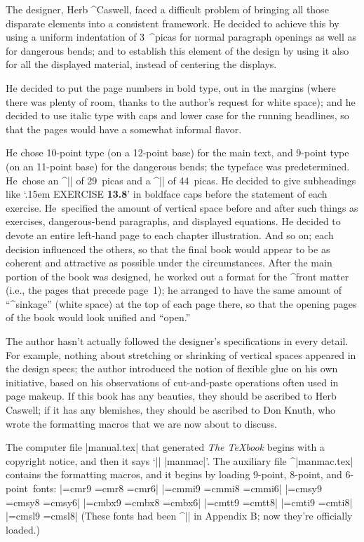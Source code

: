 The designer, Herb ^{Caswell}, faced a difficult problem of bringing all
those disparate elements into a consistent framework. He decided to achieve
this by using a uniform indentation of 3~^{picas} for normal paragraph openings
as well as for dangerous bends; and to establish this element of the design
by using it also for all the displayed material, instead of centering the
displays.

He decided to put the page numbers in bold type, out in the margins (where
there was plenty of room, thanks to the author's request for white space);
and he decided to use italic type with caps and lower case for the running
headlines, so that the pages would have a somewhat informal flavor.

He chose 10-point type (on a 12-point base) for the main text, and 9-point type
(on an 11-point base) for the dangerous bends; the typeface was predetermined.
He~chose an ^|\hsize| of 29~picas and a ^|\vsize| of 44~picas. He decided
to give subheadings like `\kern.15em
{\eightbf EXERCISE \bf13.8}' in boldface caps before the statement of each
exercise. He~specified the amount of vertical space before and after such
things as exercises, dangerous-bend paragraphs, and displayed equations.
He decided to devote an entire left-hand page to each chapter illustration.
And so on; each decision influenced the others, so that the final book would
appear to be as coherent and attractive as possible under the circumstances.
After the main portion of the book was designed, he worked out a format for
the ^{front matter} (i.e., the pages that precede page~1); he arranged to
have the same amount of ``^{sinkage}'' (white space) at the top of each page
there, so that the opening pages of the book would look unified and ``open.''

The author hasn't actually followed the designer's specifications in every
detail. For example, nothing about stretching or shrinking of vertical spaces
appeared in the design specs; the author introduced the notion of flexible
glue on his own initiative, based on his observations of cut-and-paste
operations often used in page makeup. If this book has any beauties, they
should be ascribed to Herb Caswell; if it has any blemishes, they should be
ascribed to Don Knuth, who wrote the formatting
macros that we are now about to discuss.

The computer file |manual.tex| that generated {\sl The \TeX book\/} begins
with a copyright notice, and then it says `|| |manmac|'. The auxiliary
file ^|manmac.tex| contains the formatting macros, and it begins by
loading 9-point, 8-point, and 6-point~fonts:
\beginlines
|\font\ninerm=cmr9   \font\eightrm=cmr8   \font\sixrm=cmr6|
|\font\ninei=cmmi9   \font\eighti=cmmi8   \font\sixi=cmmi6|
|\font\ninesy=cmsy9  \font\eightsy=cmsy8  \font\sixsy=cmsy6|
|\font\ninebf=cmbx9  \font\eightbf=cmbx8  \font\sixbf=cmbx6|
|\font\ninett=cmtt9  \font\eighttt=cmtt8|
|\font\nineit=cmti9  \font\eightit=cmti8|
|\font\ninesl=cmsl9  \font\eightsl=cmsl8|
\endlines
(These fonts had been ^|\preloaded| in Appendix B\null; now they're officially
loaded.)

